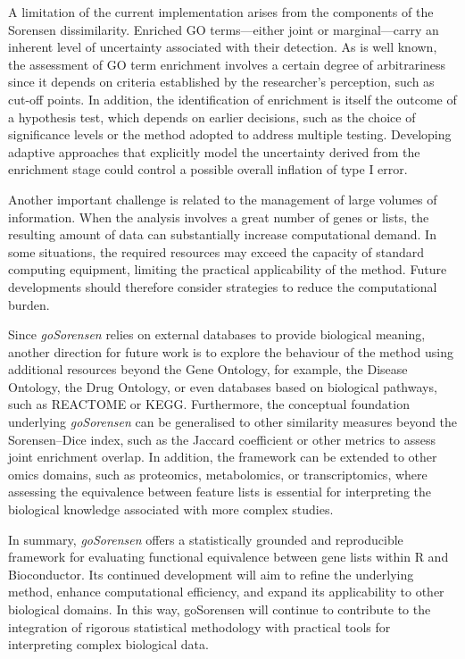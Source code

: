 A limitation of the current implementation arises from the components of the Sorensen dissimilarity. Enriched GO terms---either joint or marginal---carry an inherent level of uncertainty associated with their detection. As is well known, the assessment of GO term enrichment involves a certain degree of arbitrariness since it depends on criteria established by the researcher's perception, such as cut-off points. In addition, the identification of enrichment is itself the outcome of a hypothesis test, which depends on earlier decisions, such as the choice of significance levels or the method adopted to address multiple testing. Developing adaptive approaches that explicitly model the uncertainty derived from the enrichment stage could control a possible overall inflation of type I error.

Another important challenge is related to the management of large volumes of information. When the analysis involves a great number of genes or lists, the resulting amount of data can substantially increase computational demand. In some situations, the required resources may exceed the capacity of standard computing equipment, limiting the practical applicability of the method. Future developments should therefore consider strategies to reduce the computational burden.

Since \emph{goSorensen} relies on external databases to provide biological meaning, another direction for future work is to explore the behaviour of the method using additional resources beyond the Gene Ontology, for example, the Disease Ontology, the Drug Ontology, or even databases based on biological pathways, such as REACTOME or KEGG.
Furthermore, the conceptual foundation underlying \emph{goSorensen} can be generalised to other similarity measures beyond the Sorensen--Dice index, such as the Jaccard coefficient or other metrics to assess joint enrichment overlap.
In addition, the framework can be extended to other omics domains, such as proteomics, metabolomics, or transcriptomics, where assessing the equivalence between feature lists is essential for interpreting the biological knowledge associated with more complex studies.

In summary, \emph{goSorensen} offers a statistically grounded and reproducible framework for evaluating functional equivalence between gene lists within R and Bioconductor. Its continued development will aim to refine the underlying method, enhance computational efficiency, and expand its applicability to other biological domains. In this way, goSorensen will continue to contribute to the integration of rigorous statistical methodology with practical tools for interpreting complex biological data.

